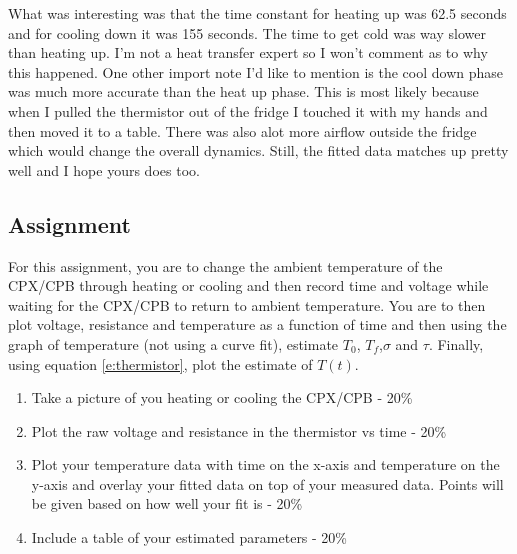 What was interesting was that the time constant for heating up was 62.5 seconds and for cooling down it was 155 seconds. The time to get cold was way slower than heating up. I’m not a heat transfer expert so I won’t comment as to why this happened. One other import note I’d like to mention is the cool down phase was much more accurate than the heat up phase. This is most likely because when I pulled the thermistor out of the fridge I touched it with my hands and then moved it to a table. There was also alot more airflow outside the fridge which would change the overall dynamics. Still, the fitted data matches up pretty well and I hope yours does too.

\subsection{Assignment}

For this assignment, you are to change the ambient temperature of the CPX/CPB through heating or cooling and then record time and voltage while waiting for the CPX/CPB to return to ambient temperature. You are to then plot voltage, resistance and temperature as a function of time and then using the graph of temperature (not using a curve fit), estimate $T_0$, $T_f$,$\sigma$ and $\tau$. Finally, using equation \ref{e:thermistor}, plot the estimate of $T(t)$.



\begin{enumerate}[itemsep=-5pt]
\item Take a picture of you heating or cooling the CPX/CPB - 20\%
\item Plot the raw voltage and resistance in the thermistor vs time - 20\%
\item Plot your temperature data with time on the x-axis and temperature on the y-axis and overlay your fitted data on top of your measured data. Points will be given based on how well your fit is - 20\%
\item Include a table of your estimated parameters - 20\%
\end{enumerate}

